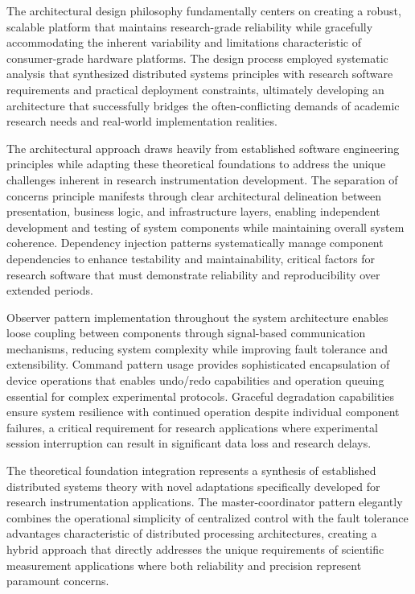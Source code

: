 \documentclass[12pt,a4paper]{article}
\begin{document}
The architectural design philosophy fundamentally centers on creating a robust, scalable platform that maintains
research-grade reliability while gracefully accommodating the inherent variability and limitations characteristic of
consumer-grade hardware platforms. The design process employed systematic analysis that synthesized distributed systems
principles with research software requirements and practical deployment constraints, ultimately developing an
architecture that successfully bridges the often-conflicting demands of academic research needs and real-world
implementation realities.

The architectural approach draws heavily from established software engineering principles while adapting these
theoretical foundations to address the unique challenges inherent in research instrumentation development. The
separation of concerns principle manifests through clear architectural delineation between presentation, business logic,
and infrastructure layers, enabling independent development and testing of system components while maintaining overall
system coherence. Dependency injection patterns systematically manage component dependencies to enhance testability and
maintainability, critical factors for research software that must demonstrate reliability and reproducibility over
extended periods.

Observer pattern implementation throughout the system architecture enables loose coupling between components through
signal-based communication mechanisms, reducing system complexity while improving fault tolerance and extensibility.
Command pattern usage provides sophisticated encapsulation of device operations that enables undo/redo capabilities and
operation queuing essential for complex experimental protocols. Graceful degradation capabilities ensure system
resilience with continued operation despite individual component failures, a critical requirement for research
applications where experimental session interruption can result in significant data loss and research delays.

The theoretical foundation integration represents a synthesis of established distributed systems theory with novel
adaptations specifically developed for research instrumentation applications. The master-coordinator pattern elegantly
combines the operational simplicity of centralized control with the fault tolerance advantages characteristic of
distributed processing architectures, creating a hybrid approach that directly addresses the unique requirements of
scientific measurement applications where both reliability and precision represent paramount concerns.
\end{document}
